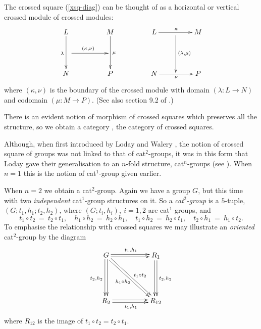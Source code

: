 \documentclass[a4paper,11pt]{article}
\theoremstyle{plain}
\theoremstyle{definition}
\begin{document}
The crossed square (\ref{xsq-diag}) can be thought of as a horizontal or vertical 
crossed module of crossed modules:
\[
\xymatrix@R=20pt@C=20pt
{ L \ar[dd]_{\lambda}  
	&  &  M \ar[dd]^{\mu} 
	      &  &  L \ar[rr]^{\kappa}
	            &  {} \ar[dd]^{(\lambda,\mu)} 
	               &  M \\ 
\quad \ar[rr]^{(\kappa,\nu)} 
    &  &  &  &  &  & \quad \\
  N &  &  P 
	      &  &  N \ar[rr]_{\nu} 
	            &  {} 
	               &  P 
} 
\]
\noindent 
where $(\kappa,\nu)$ is the boundary of the crossed module with 
domain $(\lambda : L \rightarrow N)$ and codomain $(\mu : M \rightarrow P)$. 
(See also section 9.2 of \cite{wensley-notes}.)

There is an evident notion of morphism of crossed squares  
which preserves all the structure, 
so we obtain a category \catXSq, the category of crossed squares.

\medskip
Although, when first introduced by Loday and Walery \cite{walery-loday}, 
the notion of crossed square of groups was not linked to that of cat$^{2}$-groups, 
it was in this form that Loday gave their generalisation 
to an $n$-fold structure, cat$^{n}$-groups (see \cite{Loday}). 
When $n=1$ this is the notion of cat$^1$-group given earlier.

When $n=2$ we obtain a cat$^{2}$-group. 
Again we have a group $G$, but this time with two \emph{independent} 
cat$^{1}$-group structures on it. 
So a \emph{cat$^{2}$-group} is a $5$-tuple, $(G;t_1,h_1;t_2,h_2)$, 
where $(G;t_{i},h_{i}),~ i=1,2$ are cat$^{1}$-groups, and
\[
t_{1} \circ t_{2} ~=~ t_{2} \circ t_{1}, \quad 
h_{1} \circ h_{2} ~=~ h_{2} \circ h_{1}, \quad 
t_{1} \circ h_{2} ~=~ h_{2} \circ t_{1}, \quad
t_{2} \circ h_{1} ~=~ h_{1} \circ t_{2}. 
\]
To emphasise the relationship with crossed squares 
we may illustrate an \emph{oriented} cat$^2$-group by the diagram 
\begin{equation} \label{cat2-diag}
\xymatrix@R=50pt@C=50pt 
{ G \ar@<+0.4ex>[r]^{t_1,h_1} \ar@<-0.4ex>[r] 
    \ar@<-0.4ex>[d]_{t_2,h_2} \ar@<+0.4ex>[d] 
    \ar@<-0.4ex>[rd]^{\ t_1 \circ t_2} \ar@<+0.4ex>[rd]_{h_1 \circ h_2} 
	& R_1 \ar@<+0.4ex>[d]^{t_2,h_2} \ar@<-0.4ex>[d] \\
  R_2 \ar@<-0.4ex>[r]_{t_1,h_1} \ar@<+0.4ex>[r] 
	& R_{12} 
}
\end{equation} 
where $R_{12}$ is the image of $t_1 \circ t_2 = t_2 \circ t_1$. 
\end{document}
